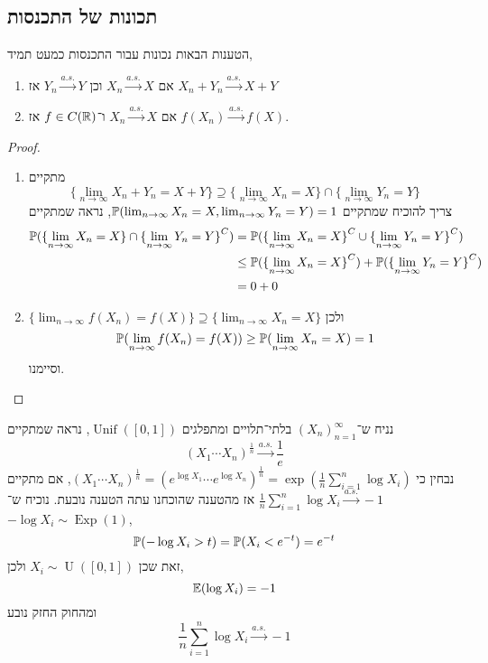 \subsection{תכונות של התכנסות}
\begin{proposition}
	הטענות הבאות נכונות עבור התכנסות כמעט תמיד,
	\begin{enumerate}
		\item אם $X_n \xrightarrow{a.s.} X$ וכן $Y_n \xrightarrow{a.s.} Y$ אז $X_n + Y_n \xrightarrow{a.s.} X + Y$
		\item אם $X_n \xrightarrow{a.s.} X$ ו־$f \in C(\mathbb{R})$ אז $f(X_n) \xrightarrow{a.s.} f(X)$.
	\end{enumerate}
\end{proposition}
\begin{proof}
	\begin{enumerate}
		\item מתקיים
			\[
				\{ \lim_{n \to \infty} X_n + Y_n = X + Y \}
				\supseteq \{ \lim_{n \to \infty} X_n = X \} \cap \{ \lim_{n \to \infty} Y_n = Y \}
			\]
			צריך להוכיח שמתקיים $\mathbb{P}(\lim_{n \to \infty} X_n = X, \lim_{n \to \infty} Y_n = Y) = 1$,
			נראה שמתקיים
			\begin{align*}
				\mathbb{P}({\{ \lim_{n \to \infty} X_n = X \} \cap \{ \lim_{n \to \infty} Y_n = Y \}}^C)
				& = \mathbb{P}({\{ \lim_{n \to \infty} X_n = X \}}^C \cup {\{ \lim_{n \to \infty} Y_n = Y \}}^C) \\
				& \le \mathbb{P}({\{ \lim_{n \to \infty} X_n = X \}}^C) + \mathbb{P}({\{ \lim_{n \to \infty} Y_n = Y \}}^C) \\
				& = 0 + 0
			\end{align*}
		\item $\{ \lim_{n \to \infty} f(X_n) = f(X) \} \supseteq \{ \lim_{n \to \infty} X_n = X \}$ ולכן
			\[
				\mathbb{P}(\lim_{n \to \infty} f(X_n) = f(X))
				\ge \mathbb{P}(\lim_{n \to \infty} X_n = X)
				= 1
			\]
			וסיימנו.
	\end{enumerate}
\end{proof}
\begin{example}
	נניח ש־${(X_n)}_{n = 1}^\infty$ בלתי־תלויים ומתפלגים $\operatorname{Unif}([0, 1])$, נראה שמתקיים
	\[
		{(X_1 \cdots X_n)}^{\frac{1}{n}}
		\xrightarrow{a.s.} \frac{1}{e}
	\]
	נבחין כי ${(X_1 \cdots X_n)}^{\frac{1}{n}} = {(e^{\log X_1} \cdots e^{\log X_n})}^{\frac{1}{n}} = \exp(\frac{1}{n} \sum_{i = 1}^{n} \log X_i)$,
	אם מתקיים $\frac{1}{n} \sum_{i = 1}^{n} \log X_i \xrightarrow{a.s.} -1$ אז מהטענה שהוכחנו עתה הטענה נובעת.
	נוכיח ש־$-\log X_i \sim \operatorname{Exp}(1)$,
	\[
		\mathbb{P}(-\log X_i > t)
		= \mathbb{P}(X_i < e^{-t})
		= e^{-t}
	\]
	זאת שכן $X_i \sim \operatorname{U}([0, 1])$ ולכן,
	\[
		\mathbb{E}(\log X_i) = -1
	\]
	ומהחוק החזק נובע
	\[
		\frac{1}{n} \sum_{i = 1}^{n} \log X_i
		\xrightarrow{a.s.} -1
	\]
\end{example}


